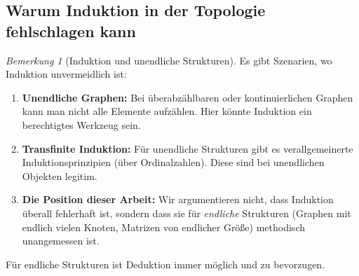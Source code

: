 \documentclass[12pt, a4paper]{article}
\theoremstyle{definition}
\theoremstyle{remark}
\newtheorem{remark}[theorem]{Bemerkung}
\begin{document}
\subsection{Warum Induktion in der Topologie fehlschlagen kann}
\label{subsec:anhang_induktion_topologie}

\begin{remark}[Induktion und unendliche Strukturen]
\label{rem:anhang_induktion_unendlich}
Es gibt Szenarien, wo Induktion unvermeidlich ist:

\begin{enumerate}[label=(\alph*)]
  \item \textbf{Unendliche Graphen:} Bei überabzählbaren oder kontinuierlichen Graphen kann man nicht alle Elemente aufzählen. Hier könnte Induktion ein berechtigtes Werkzeug sein.
  
  \item \textbf{Transfinite Induktion:} Für unendliche Strukturen gibt es verallgemeinerte Induktionsprinzipien (über Ordinalzahlen). Diese sind bei unendlichen Objekten legitim.
  
  \item \textbf{Die Position dieser Arbeit:} Wir argumentieren nicht, dass Induktion überall fehlerhaft ist, sondern dass sie für \emph{endliche} Strukturen (Graphen mit endlich vielen Knoten, Matrizen von endlicher Größe) methodisch unangemessen ist.
\end{enumerate}

Für endliche Strukturen ist Deduktion immer möglich und zu bevorzugen.
\end{remark}
\end{document}
